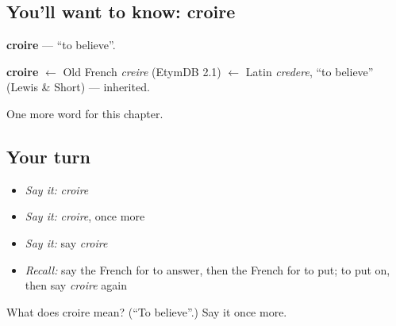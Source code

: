 \subsection*{You'll want to know: croire}
\textbf{croire} — \textquotedblleft{}to believe\textquotedblright{}.

\begin{cousinweb}
\textbf{croire} $\leftarrow$ Old French \emph{creire} (EtymDB 2.1) $\leftarrow$ Latin \emph{credere}, \textquotedblleft{}to believe\textquotedblright{} (Lewis \& Short) — inherited.
\end{cousinweb}

\begin{grammarlens}[title={What you've built}]
One more word for this chapter.
\end{grammarlens}

\subsection*{Your turn}
\begin{itemize}
\raggedright
  \item \emph{Say it:} \emph{croire}
  \item \emph{Say it:} \emph{croire}, once more
  \item \emph{Say it:} say \emph{croire}
  \item \emph{Recall:} say the French for to answer, then the French for to put; to put on, then say \emph{croire} again
\end{itemize}

\begin{tcolorbox}[breakable,colback=teal!4,colframe=teal!35!black,title={Before you move on}]
What does croire mean? (\textquotedblleft{}To believe\textquotedblright{}.) Say it once more.
\end{tcolorbox}
